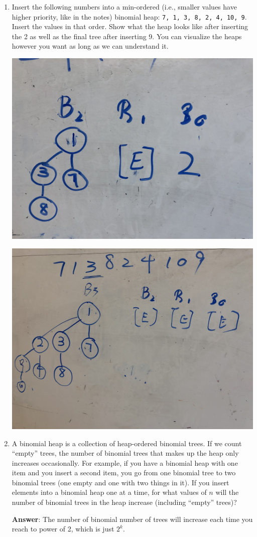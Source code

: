 \documentclass[11pt]{article}
\begin{document}
\begin{enumerate}
\begin{enumerate}

\item Insert the following numbers into a min-ordered (i.e., smaller values have higher priority, like in the notes) binomial heap: \texttt{7, 1, 3, 8, 2, 4, 10, 9}.  Insert the values in that order. Show what the heap looks like after inserting the 2 as well as the final tree after inserting 9.  You can visualize the heaps however you want as long as we can understand it.

    \includegraphics[width=0.5\linewidth]{WechatIMG36.jpeg}

    \includegraphics[width=0.5\linewidth]{WechatIMG35.jpeg}

\item A binomial heap is a collection of heap-ordered binomial trees.  If we count ``empty'' trees, the number of binomial trees that makes up the heap only increases occasionally.  For example, if you have a binomial heap with one item and you insert a second item, you go from one binomial tree to two binomial trees (one empty and one with two things in it).  If you insert elements into a binomial heap one at a time, for what values of $n$ will the number of binomial trees in the heap increase (including ``empty'' trees)?

\textbf{Answer}:
The number of binomial number of trees will increase each time you reach to power of 2, which is just $2^k$.

\end{enumerate}
 
\end{enumerate}
\end{document}
